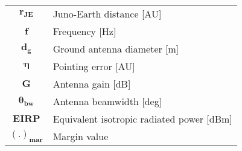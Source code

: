 \begin{multicols}{2}
{\begin{xltabular}{\linewidth}{c>{\raggedright\arraybackslash}X}
		$\boldsymbol{r_{JE}}$ & Juno-Earth distance [AU] \\
		$\boldsymbol{f}$ & Frequency [Hz] \\
		$\boldsymbol{d_g}$ & Ground antenna diameter [m] \\
		$\boldsymbol{\eta}$ & Pointing error [AU] \\
		$\boldsymbol{G}$ & Antenna gain [dB] \\
		$\boldsymbol{\theta_{bw}}$ & Antenna beamwidth [deg] \\
		$\boldsymbol{EIRP}$ & Equivalent isotropic radiated power [dBm] \\
		$\boldsymbol{(.)_{mar}}$ & Margin value \\
		

 	\end{xltabular}
	\unskip
	\unpenalty
	\unpenalty}
	\unvbox\ltmcbox
\end{multicols}